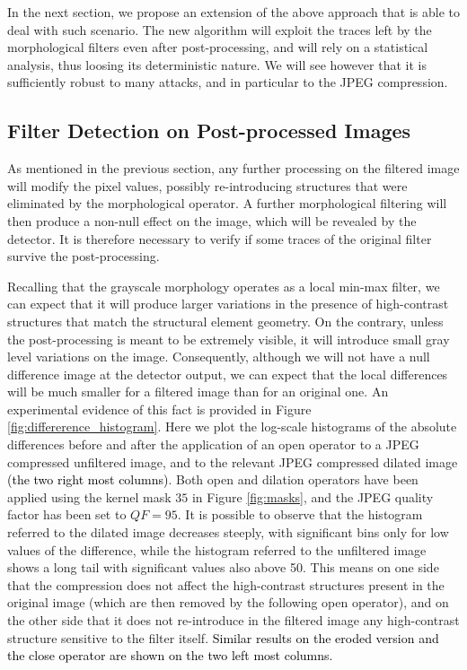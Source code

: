 \documentclass{ieeeaccess}
\newcommand{\revisedtext}[1]{\textcolor{black}{#1}}
\begin{document}
In the next section, we propose an extension of the above approach that is able to deal with such scenario. The new algorithm will exploit the traces left by the morphological filters even after post-processing, and will rely on a statistical analysis, thus loosing its deterministic nature. We will see however that it is sufficiently robust to many attacks, and in particular to the JPEG compression.

\subsection{Filter Detection on Post-processed Images}
As mentioned in the previous section, any further processing on the filtered image will modify the pixel values, possibly re-introducing structures that were eliminated by the morphological operator. A further morphological filtering will then produce a non-null effect on the image, which will be revealed by the detector. It is therefore necessary to verify if some traces of the original filter survive the post-processing.

Recalling that the grayscale morphology operates as a local min-max filter, we can expect that it will produce larger variations in the presence of high-contrast structures that match the structural element geometry. On the contrary, unless the post-processing is meant to be extremely visible, it will introduce small gray level variations on the image. Consequently, although we will not have a null difference image at the detector output, we can expect that the local differences will be much smaller for a filtered image than for an original one. An experimental evidence of this fact is provided in Figure \ref{fig:differerence_histogram}. Here we plot the log-scale histograms of the absolute differences before and after the application of an open operator to a JPEG compressed unfiltered image, and to the relevant JPEG compressed dilated image \revisedtext{(the two right most columns)}. Both open and dilation operators have been applied using the kernel mask $35$ in Figure \ref{fig:masks}, and the JPEG quality factor has been set to $QF=95$. It is possible to observe that the histogram referred to the dilated image decreases steeply, with significant bins only for low values of the difference, while the histogram referred to the unfiltered image shows a long tail with significant values also above 50. This means on one side that the compression does not affect the high-contrast structures present in the original image (which are then removed by the following open operator), and on the other side that it does not re-introduce in the filtered image any high-contrast structure sensitive to the filter itself. \revisedtext{Similar results on the eroded version and the close operator are shown on the two left most columns.}
\end{document}
